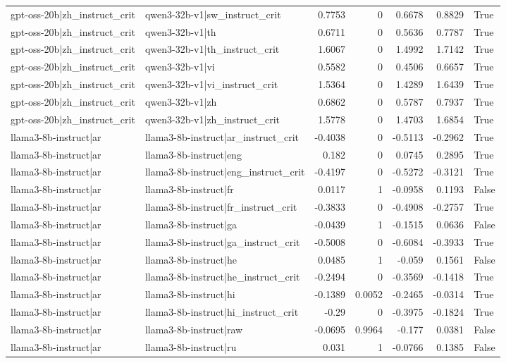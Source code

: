\begin{table}
\begin{tabular}{l l r r r r l}
gpt-oss-20b|zh_instruct_crit & qwen3-32b-v1|sw_instruct_crit & 0.7753 & 0 & 0.6678 & 0.8829 & True \\
gpt-oss-20b|zh_instruct_crit & qwen3-32b-v1|th & 0.6711 & 0 & 0.5636 & 0.7787 & True \\
gpt-oss-20b|zh_instruct_crit & qwen3-32b-v1|th_instruct_crit & 1.6067 & 0 & 1.4992 & 1.7142 & True \\
gpt-oss-20b|zh_instruct_crit & qwen3-32b-v1|vi & 0.5582 & 0 & 0.4506 & 0.6657 & True \\
gpt-oss-20b|zh_instruct_crit & qwen3-32b-v1|vi_instruct_crit & 1.5364 & 0 & 1.4289 & 1.6439 & True \\
gpt-oss-20b|zh_instruct_crit & qwen3-32b-v1|zh & 0.6862 & 0 & 0.5787 & 0.7937 & True \\
gpt-oss-20b|zh_instruct_crit & qwen3-32b-v1|zh_instruct_crit & 1.5778 & 0 & 1.4703 & 1.6854 & True \\
llama3-8b-instruct|ar & llama3-8b-instruct|ar_instruct_crit & -0.4038 & 0 & -0.5113 & -0.2962 & True \\
llama3-8b-instruct|ar & llama3-8b-instruct|eng & 0.182 & 0 & 0.0745 & 0.2895 & True \\
llama3-8b-instruct|ar & llama3-8b-instruct|eng_instruct_crit & -0.4197 & 0 & -0.5272 & -0.3121 & True \\
llama3-8b-instruct|ar & llama3-8b-instruct|fr & 0.0117 & 1 & -0.0958 & 0.1193 & False \\
llama3-8b-instruct|ar & llama3-8b-instruct|fr_instruct_crit & -0.3833 & 0 & -0.4908 & -0.2757 & True \\
llama3-8b-instruct|ar & llama3-8b-instruct|ga & -0.0439 & 1 & -0.1515 & 0.0636 & False \\
llama3-8b-instruct|ar & llama3-8b-instruct|ga_instruct_crit & -0.5008 & 0 & -0.6084 & -0.3933 & True \\
llama3-8b-instruct|ar & llama3-8b-instruct|he & 0.0485 & 1 & -0.059 & 0.1561 & False \\
llama3-8b-instruct|ar & llama3-8b-instruct|he_instruct_crit & -0.2494 & 0 & -0.3569 & -0.1418 & True \\
llama3-8b-instruct|ar & llama3-8b-instruct|hi & -0.1389 & 0.0052 & -0.2465 & -0.0314 & True \\
llama3-8b-instruct|ar & llama3-8b-instruct|hi_instruct_crit & -0.29 & 0 & -0.3975 & -0.1824 & True \\
llama3-8b-instruct|ar & llama3-8b-instruct|raw & -0.0695 & 0.9964 & -0.177 & 0.0381 & False \\
llama3-8b-instruct|ar & llama3-8b-instruct|ru & 0.031 & 1 & -0.0766 & 0.1385 & False \\

\end{tabular}
\end{table}
